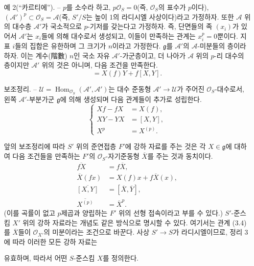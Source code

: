 \textsc{예 2(“카르티에”).} -- $p$를 소수라 하고,
$p\mathcal O_S=0$(즉, $\mathcal O_S$의 표수가 $p$이다),
$(\mathcal A')^p\subset\mathcal O_S=\mathcal A$(즉, $S'/S$는 높이 1의
라디시엘 사상이다)라고 가정하자. 또한 $\mathcal A$ 위의 대수층
$\mathcal A'$가 국소적으로 $p$-기저를 갖는다고 가정하자. 즉, 단면들의
족 $(x_i)$가 있어서 $\mathcal A'$는 $x_i$들에 의해 대수로서 생성되고,
이들이 만족하는 관계는 $x_i^p=0$뿐이다. 지표 $i$들의 집합은 유한하며
그 크기가 $n$이라고 가정한다. $\mathfrak g$를 $\mathcal A'$의
$\mathcal A$-미분들의 층이라 하자. 이는 계수(階數) $n$인 국소 자유
$\mathcal A'$-가군층이고, 더 나아가 $\mathcal A$ 위의 $p$-리 대수의
층이지만 $\mathcal A'$ 위의 것은 아니며, 다음 조건을 만족한다.
\begin{equation}
  [X,fY]=X(f)Y+f[X,Y].
  \tag{3.5}
\end{equation}

\textsc{보조정리.} -- $\mathcal U=
\operatorname{Hom}_{\mathcal O_S}(\mathcal A',\mathcal A')$는 대수 준동형
$\mathcal A'\longrightarrow\mathcal U$가 주어진 $\mathcal O_S$-대수로서,
왼쪽 $\mathcal A'$-부분가군 $\mathfrak g$에 의해 생성되며 다음 관계들이
추가로 성립한다.
\begin{equation}
  \left\{
  \begin{aligned}
    Xf-fX&=X(f),\\
    XY-YX&=[X,Y],\\
    X^p&=X^{(p)}.
  \end{aligned}
  \right.
  \tag{3.6}
\end{equation}

앞의 보조정리에 따라 $S'$ 위의 준연접층 $F'$에 강하 자료를 주는 것은
각 $X\in\mathfrak g$에 대하여 다음 조건들을 만족하는 $F'$의
$\mathcal O_S$-자기준동형 $\overline X$를 주는 것과 동치이다.
\begin{align}
  \overline{fX}&=f\overline X, \tag{3.7}\\
  \overline X(fx)&=X(f)x+f\overline X(x), \tag{3.8}\\
  \overline{[X,Y]}&=[\overline X,\overline Y], \tag{3.9}\\
  \overline{X^{(p)}}&=\overline X^p. \tag{3.10}
\end{align}
(이를 곡률이 없고 $p$제곱과 양립하는 $F'$ 위의 선형 접속이라고 부를 수
있다.) $S'$-준스킴 $X'$ 위의 강하 자료라는 개념도 같은 방식으로 명시할 수
있다. 여기서는 관계 (3.4)를 $\overline X$들이 $\mathcal O_{X'}$의
미분이라는 조건으로 바꾼다. 사상 $S'\longrightarrow S$가 라디시엘이므로,
정리 3에 따라 이러한 모든 강하 자료는

유효하며, 따라서 어떤 $S$-준스킴 $X$를 정의한다.

